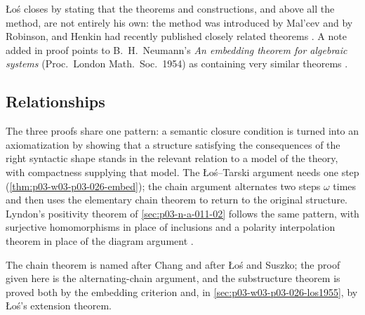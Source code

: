 \L o\'s closes by stating that the theorems and constructions, and above all
the method, are not entirely his own: the method was introduced by Mal'cev
and by Robinson, and Henkin had recently published closely related theorems
\cite[p.~54]{Los1955}.  A note added in proof points to B.~H.~Neumann's
\emph{An embedding theorem for algebraic systems} (Proc.\ London Math.\
Soc.\ 1954) as containing very similar theorems \cite[p.~54]{Los1955}.

\subsection{Relationships}
\label{sec:p03-w03-p03-026-relationships}

The three proofs share one pattern: a semantic closure condition is turned
into an axiomatization by showing that a structure satisfying the
consequences of the right syntactic shape stands in the relevant relation to
a model of the theory, with compactness supplying that model.  The
\L o\'s--Tarski argument needs one step (\cref{thm:p03-w03-p03-026-embed});
the chain argument alternates two steps \(\omega\) times and then uses the
elementary chain theorem to return to the original structure.  Lyndon's
positivity theorem of \cref{sec:p03-n-a-011-02} follows the same pattern,
with surjective homomorphisms in place of inclusions and a polarity
interpolation theorem in place of the diagram argument
\cite{Lyndon1959}.

The chain theorem is named after Chang and after \L o\'s and Suszko; the
proof given here is the alternating-chain argument, and the substructure
theorem is proved both by the embedding criterion and, in
\cref{sec:p03-w03-p03-026-los1955}, by \L o\'s's extension theorem.
